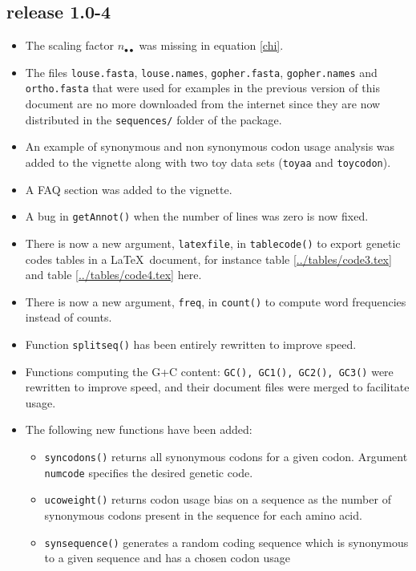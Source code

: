 \documentclass{article}
\begin{document}
\subsection{release 1.0-4}

\begin{itemize}
\item The scaling factor $n_{\bullet\bullet}$ was missing in equation \ref{chi}.
\item The files \texttt{louse.fasta}, \texttt{louse.names}, \texttt{gopher.fasta}, \texttt{gopher.names}
and \texttt{ortho.fasta} that were used for examples in the previous version of this document are
no more downloaded from the internet since they are now distributed in the \texttt{sequences/} folder
of the package.
\item An example of synonymous and non synonymous codon usage analysis was added to the
vignette along with two toy data sets (\texttt{toyaa} and \texttt{toycodon}).
\item A FAQ section was added to the vignette.
\item A bug in \texttt{getAnnot()} when the number of lines was zero is now fixed.
\item There is now a new argument, \texttt{latexfile}, in \texttt{tablecode()} to export genetic codes
tables in a \LaTeX~document, for instance table \ref{../tables/code3.tex} and table \ref{../tables/code4.tex} here.
\item There is now a new argument, \texttt{freq}, in \texttt{count()}
  to compute word frequencies instead of counts.
\item Function \texttt{splitseq()} has been entirely rewritten to improve speed.
\item Functions computing the G+C content: \texttt{GC(), GC1(), GC2(),
  GC3()} were rewritten to improve speed, and their document files
  were merged to facilitate usage.
\item The following new functions have been added:
\begin{itemize}
\item \texttt{syncodons()} returns all synonymous codons for a given
  codon. Argument \texttt{numcode} specifies the desired genetic code.
\item \texttt{ucoweight()} returns codon usage bias on a sequence as
  the number of synonymous codons present in the sequence for each
  amino acid.
\item \texttt{synsequence()} generates a random coding sequence which
      is synonymous to a given sequence and has a chosen codon usage

\end{itemize}
\end{itemize}
\end{document}
